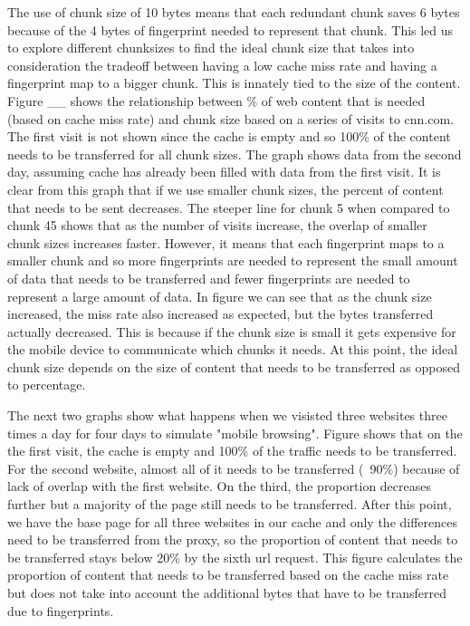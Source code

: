 The use of chunk size of 10 bytes means that each redundant chunk saves 6 bytes because of the 4 bytes of fingerprint needed to represent that chunk. This led us to explore different chunksizes to find the ideal chunk size that takes into consideration the tradeoff between having a low cache miss rate and having a fingerprint map to a bigger chunk. This is innately tied to the size of the content. Figure __ shows the relationship between \% of web content that is needed (based on cache miss rate) and chunk size based on a series of visits to cnn.com. The first visit is not shown since the cache is empty and so 100\% of the content needs to be transferred for all chunk sizes. The graph shows data from the second day, assuming cache has already been filled with data from the first visit. It is clear from this graph that if we use smaller chunk sizes, the percent of content that needs to be sent decreases. The steeper line for chunk 5 when compared to chunk 45 shows that as the number of visits increase, the overlap of smaller chunk sizes increases faster. 	However, it means that each fingerprint maps to a smaller chunk and so more fingerprints are needed to represent the small amount of data that needs to be transferred and fewer fingerprints are needed to represent a large amount of data. In figure we can see that as the chunk size increased, the miss rate also increased as expected, but the bytes transferred actually decreased. This is because if the chunk size is small it gets expensive for the mobile device to communicate which chunks it needs. At this point, the ideal chunk size depends on the size of content that needs to be transferred as opposed to percentage.

The next two graphs show what happens when we visisted three websites three times a day for four days to simulate "mobile browsing". Figure shows that on the the first visit, the cache is empty and 100\% of the traffic needs to be transferred. For the second website, almost all of it needs to be transferred (~90\%) because of lack of overlap with the first website. On the third, the proportion decreases further but a majority of the page still needs to be transferred. After this point, we have the base page for all three websites in our cache and only the differences need to be transferred from the proxy, so the proportion of content that needs to be transferred stays below 20\% by the sixth url request. This figure calculates the proportion of content that needs to be transferred based on the cache miss rate but does not take into account the additional bytes that have to be transferred due to fingerprints.

